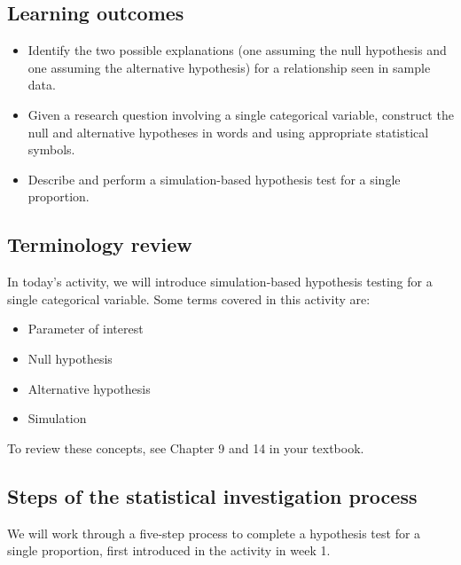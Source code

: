 \documentclass[
]{report}
\begin{document}

\hypertarget{learning-outcomes-9}{%
\subsection{Learning outcomes}\label{learning-outcomes-9}}

\begin{itemize}
\item
  Identify the two possible explanations (one assuming the null hypothesis and one assuming the alternative hypothesis) for a relationship seen in sample data.
\item
  Given a research question involving a single categorical variable, construct the null and alternative hypotheses
  in words and using appropriate statistical symbols.
\item
  Describe and perform a simulation-based hypothesis test for a single proportion.
\end{itemize}

\hypertarget{terminology-review-8}{%
\subsection{Terminology review}\label{terminology-review-8}}

In today's activity, we will introduce simulation-based hypothesis testing for a single categorical variable. Some terms covered in this activity are:

\begin{itemize}
\item
  Parameter of interest
\item
  Null hypothesis
\item
  Alternative hypothesis
\item
  Simulation
\end{itemize}

To review these concepts, see Chapter 9 and 14 in your textbook.

\hypertarget{steps-of-the-statistical-investigation-process-1}{%
\subsection{Steps of the statistical investigation process}\label{steps-of-the-statistical-investigation-process-1}}

We will work through a five-step process to complete a hypothesis test for a single proportion, first introduced in the activity in week 1.
\end{document}
